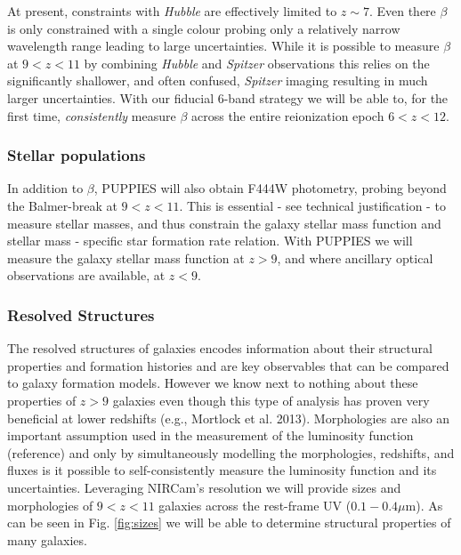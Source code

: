 \documentclass[12pt]{article}
\begin{document}
At present, constraints with \emph{Hubble} are effectively limited to $z\sim 7$. Even there $\beta$ is only constrained with a single colour probing only a relatively narrow wavelength range leading to large uncertainties. While it is possible to measure $\beta$ at $9<z<11$ by combining {\em Hubble} and {\em Spitzer} observations \citep[e.g][]{2016MNRAS.455..659W} this relies on the significantly shallower, and often confused, {\em Spitzer} imaging resulting in much larger uncertainties. With our fiducial 6-band strategy we will be able to, for the first time, \emph{consistently} measure $\beta$ across the entire reionization epoch $6<z<12$.

\subsubsection*{\bf Stellar populations}\label{sec:properties}

In addition to $\beta$, PUPPIES will also obtain F444W photometry, probing beyond the Balmer-break at $9<z<11$. This is essential - see technical justification - to measure stellar masses, and thus constrain the galaxy stellar mass function and stellar mass - specific star formation rate relation. With PUPPIES we will measure the galaxy stellar mass function at $z>9$, and where ancillary optical observations are available, at $z<9$. 


\subsubsection{\bf Resolved Structures}

The resolved structures of galaxies encodes information about their structural properties and formation histories and are key observables that can be compared to galaxy formation models.  However we know next to nothing about these properties of $z > 9$ galaxies even though this type of analysis has proven very beneficial at lower redshifts (e.g., Mortlock et al. 2013).  Morphologies are also an important assumption used in the measurement of the luminosity function (reference) and only by simultaneously modelling the morphologies, redshifts, and fluxes is it possible to self-consistently measure the luminosity function and its uncertainties. Leveraging NIRCam's resolution we will provide sizes and morphologies of $9<z<11$ galaxies across the rest-frame UV ($0.1-0.4\mu$m).  As can be seen in Fig. \ref{fig:sizes} we will be able to determine structural properties of many galaxies.
\end{document}
